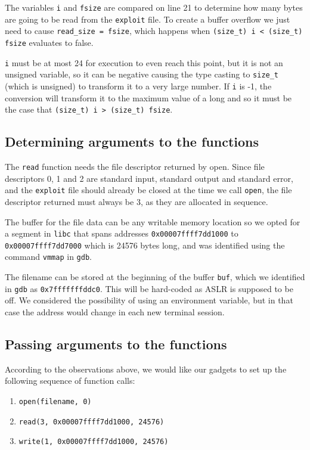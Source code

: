 \documentclass[12pt]{article}
\begin{document}
The variables \texttt{i} and \texttt{fsize} are compared on line 21 to determine how many bytes are going to be read from the \texttt{exploit} file. To create a buffer overflow we just need to cause \texttt{read\_size = fsize}, which happens when \texttt{(size\_t) i < (size\_t) fsize} evaluates to false.

\texttt{i} must be at most 24 for execution to even reach this point, but it is not an unsigned variable, so it can be negative causing the type casting to \texttt{size\_t} (which is unsigned) to transform it to a very large number. If \texttt{i} is -1, the conversion will transform it to the maximum value of a long and so it must be the case that \texttt{(size\_t) i > (size\_t) fsize}.

\subsection{Determining arguments to the functions}

The \texttt{read} function needs the file descriptor returned by open. Since file descriptors 0, 1 and 2 are standard input, standard output and standard error, and the \texttt{exploit} file should already be closed at the time we call \texttt{open}, the file descriptor returned must always be 3, as they are allocated in sequence.

The buffer for the file data can be any writable memory location so we opted for a segment in \texttt{libc} that spans addresses \texttt{0x00007ffff7dd1000} to \texttt{0x00007ffff7dd7000}  which is 24576 bytes long, and was identified using the command \texttt{vmmap} in \texttt{gdb}.

The filename can be stored at the beginning of the buffer \texttt{buf}, which we identified in \texttt{gdb} as \texttt{0x7fffffffddc0}. This will be hard-coded as ASLR is supposed to be off. We considered the possibility of using an environment variable, but in that case the address would change in each new terminal session. 


\subsection{Passing arguments to the functions}

According to the observations above, we would like our gadgets to set up the following sequence of function calls:
\begin{enumerate}
    \itemsep0em
    \item \texttt{open(filename, 0)}
    \item \texttt{read(3, 0x00007ffff7dd1000, 24576)}
    \item \texttt{write(1, 0x00007ffff7dd1000, 24576)}
\end{enumerate}
\end{document}

